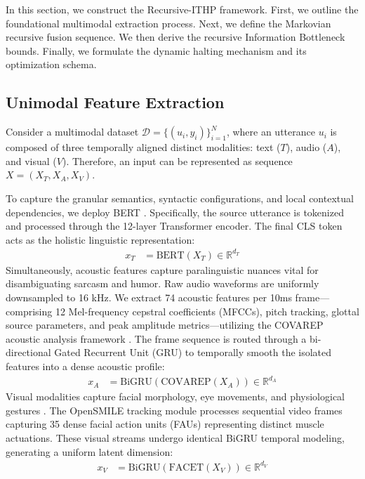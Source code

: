 \documentclass[11pt]{article}
\begin{document}
In this section, we construct the Recursive-ITHP framework. First, we outline the foundational multimodal extraction process. Next, we define the Markovian recursive fusion sequence. We then derive the recursive Information Bottleneck bounds. Finally, we formulate the dynamic halting mechanism and its optimization schema.


\subsection{Unimodal Feature Extraction}
Consider a multimodal dataset $\mathcal{D} = \{ (u_i, y_i) \}_{i=1}^{N}$, where an utterance $u_i$ is composed of three temporally aligned distinct modalities: text ($T$), audio ($A$), and visual ($V$). Therefore, an input can be represented as sequence $X = (X_{T}, X_{A}, X_{V})$.

To capture the granular semantics, syntactic configurations, and local contextual dependencies, we deploy BERT \citep{devlin2018bert}. Specifically, the source utterance is tokenized and processed through the 12-layer Transformer encoder. The final CLS token acts as the holistic linguistic representation:
\begin{align}
    x_{T} & = \text{BERT}(X_{T}) \in \mathbb{R}^{d_{T}}
\end{align}
Simultaneously, acoustic features capture paralinguistic nuances vital for disambiguating sarcasm and humor. Raw audio waveforms are uniformly downsampled to 16 kHz. We extract 74 acoustic features per 10ms frame—comprising 12 Mel-frequency cepstral coefficients (MFCCs), pitch tracking, glottal source parameters, and peak amplitude metrics—utilizing the COVAREP acoustic analysis framework \citep{degottex2014covarep}. The frame sequence is routed through a bi-directional Gated Recurrent Unit (GRU) to temporally smooth the isolated features into a dense acoustic profile:
\begin{align}
    x_{A} & = \text{BiGRU}(\text{COVAREP}(X_{A})) \in \mathbb{R}^{d_{A}}
\end{align}
Visual modalities capture facial morphology, eye movements, and physiological gestures \citep{morency2011multisentense}. The OpenSMILE tracking module processes sequential video frames capturing 35 dense facial action units (FAUs) representing distinct muscle actuations. These visual streams undergo identical BiGRU temporal modeling, generating a uniform latent dimension:
\begin{align}
    x_{V} & = \text{BiGRU}(\text{FACET}(X_{V})) \in \mathbb{R}^{d_{V}}
\end{align}
\end{document}
